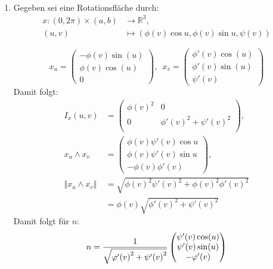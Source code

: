 \begin{solution}
  \
  \begin{enumerate}[label= (\alph*)] 
    \item Gegeben sei eine Rotationsfläche durch:
    \begin{align*}
      x:(0,2\pi) \times (a,b) &\to \mathbb{R}^3, \\
      (u,v) &\mapsto (\phi(v)\cos u, \phi(v)\sin u, \psi(v))
    \end{align*}
    
    \begin{equation*}
      x_u = \begin{pmatrix}
        -\phi(v)\sin(u) \\ \phi(v)\cos(u) \\ 0 
      \end{pmatrix}, \enspace
      x_v = \begin{pmatrix}
        \phi'(v)\cos(u) \\ \phi'(v)\sin(u) \\ \psi'(v) 
      \end{pmatrix} 
    \end{equation*}
    Damit folgt: 
    \begin{align*}
      I_x(u,v) &= 
      \begin{pmatrix}
        {\phi(v)}^2 & 0 \\
        0 & {\phi'(v)}^2 + {\psi'(v)}^2 \\
      \end{pmatrix}, \\
      x_u \land x_v &= 
      \begin{pmatrix}
        \phi(v) \psi'(v) \cos u \\
        \phi(v) \psi'(v) \sin u \\
        -\phi(v) \phi'(v)
      \end{pmatrix}, \\
      \Vert x_u \land x_v \Vert &= \sqrt{ {\phi(v)}^2 {\psi'(v)}^2 + {\phi(v)}^2 {\phi'(v)}^2} \\
      &= \phi(v) \sqrt{ {\phi'(v)}^2 + {\psi'(v)}^2}
    \end{align*}
    Damit folgt für \( n \):
    \begin{equation*}
      \centering
      n = \frac{1}{\sqrt{ {\phi'(v)}^2 + {\psi'(v)}^2}} \begin{pmatrix}
        \psi'(v) \cos(u) \\
        \psi'(v) \sin(u) \\
        -\phi'(v)
      \end{pmatrix}

\end{equation*}
\end{enumerate}
\end{solution}
